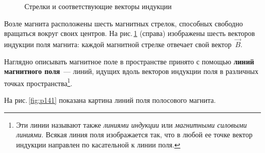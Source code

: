\documentclass[main.tex]{subfiles}
\begin{document}
\begin{figure}[H]
\caption{Стрелки и соответствующие векторы индукции}
\label{fig:p140}
\end{figure}



Возле магнита расположены шесть магнитных стрелок, способных свободно вращаться вокруг своих центров. На рис.\,\ref{fig:p140} (справа) изображены шесть векторов индукции поля магнита: каждой магнитной стрелке отвечает свой вектор~$\vec B$.  

Наглядно описывать магнитное поле в пространстве принято с помощью \textbf{линий магнитного поля}~--- линий, идущих вдоль векторов индукции поля в различных точках пространства\footnote{Эти линии называют также \emph{линиями индукции} или \emph{магнитными силовыми линиями}. Всякая линия поля изображается так, что в любой ее точке вектор индукции направлен по касательной к линии поля.}.

На рис.\,\ref{fig:p141} показана картина линий поля полосового магнита.
\end{document}
